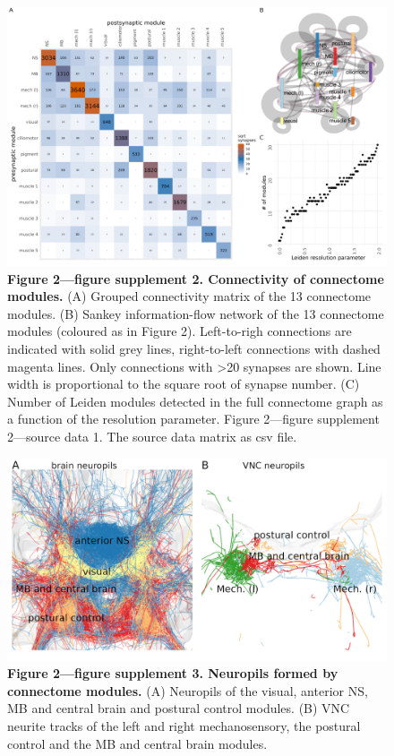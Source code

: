 \documentclass[
  11pt,
]{article}
\begin{document}
\begin{figure}[H]

{\centering \includegraphics[width=1\textwidth,height=\textheight]{Figures/Figure2_fig_suppl2.png}

}

\caption{\textbf{Figure 2---figure supplement 2. Connectivity of
connectome modules.} (A) Grouped connectivity matrix of the 13
connectome modules. (B) Sankey information-flow network of the 13
connectome modules (coloured as in Figure 2). Left-to-righ connections
are indicated with solid grey lines, right-to-left connections with
dashed magenta lines. Only connections with \textgreater20 synapses are
shown. Line width is proportional to the square root of synapse number.
(C) Number of Leiden modules detected in the full connectome graph as a
function of the resolution parameter. Figure 2---figure supplement
2---source data 1. The source data matrix as csv file.}

\end{figure}%

\begin{figure}[H]

{\centering \includegraphics[width=1\textwidth,height=\textheight]{Figures/Figure2_fig_suppl3.png}

}

\caption{\textbf{Figure 2---figure supplement 3. Neuropils formed by
connectome modules.} (A) Neuropils of the visual, anterior NS, MB and
central brain and postural control modules. (B) VNC neurite tracks of
the left and right mechanosensory, the postural control and the MB and
central brain modules.}

\end{figure}%
\end{document}
